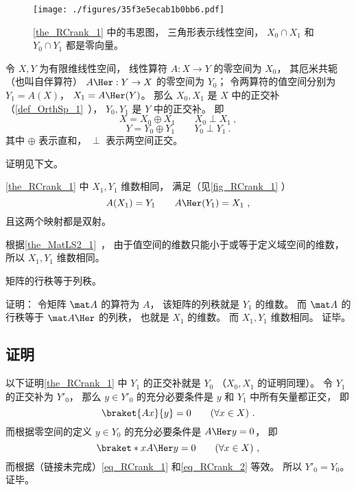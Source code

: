 

\begin{figure}[ht]
\centering
\texttt{[image: ./figures/35f3e5ecab1b0bb6.pdf]}
\caption{\autoref{the_RCrank_1} 中的韦恩图， 三角形表示线性空间， $X_0\cap X_1$ 和 $Y_0\cap  Y_1$ 都是零向量。} \label{fig_RCrank_1}
\end{figure}

\addTODO{!}
\begin{theorem}{}\label{the_RCrank_1}
令 $X, Y$ 为有限维线性空间， 线性算符 $A:X \to Y$ 的零空间为 $X_0$， 其厄米共轭（也叫自伴算符） $A\Her: Y \to X$ 的零空间为 $Y_0$； 令两算符的值空间分别为 $Y_1 = A(X)$， $X_1 = A\Her(Y)$。 那么 $X_0, X_1$ 是 $X$ 中的正交补（\autoref{def_OrthSp_1}~）， $Y_0, Y_1$ 是 $Y$ 中的正交补。 即
\begin{equation}
X = X_0 \oplus X_1 \qquad X_0 \perp X_1~,
\end{equation}
\begin{equation}
Y = Y_0 \oplus Y_1 \qquad Y_0 \perp Y_1~.
\end{equation}
其中 $\oplus$ 表示直和， $\perp$ 表示两空间正交。
\end{theorem}
证明见下文。

\begin{corollary}{}
\autoref{the_RCrank_1} 中 $X_1, Y_1$ 维数相同， 满足（见\autoref{fig_RCrank_1} ）
\begin{equation}\label{eq_RCrank_3}
A(X_1) = Y_1 \qquad A\Her (Y_1) = X_1~,
\end{equation}
且这两个映射都是双射。
\end{corollary}
根据\autoref{the_MatLS2_1}~， 
由于值空间的维数只能小于或等于定义域空间的维数， 所以 $X_1, Y_1$ 维数相同。

\begin{corollary}{}\label{cor_RCrank_1}
矩阵的行秩等于列秩。
\end{corollary}
证明： 令矩阵 $\mat A$ 的算符为 $A$， 该矩阵的列秩就是 $Y_1$ 的维数。 而 $\mat A$ 的行秩等于 $\mat A\Her$ 的列秩， 也就是 $X_1$ 的维数。 而 $X_1, Y_1$ 维数相同。 证毕。

\subsection{证明}
以下证明\autoref{the_RCrank_1} 中 $Y_1$ 的正交补就是 $Y_0$ （$X_0, X_1$ 的证明同理）。 令 $Y_1$ 的正交补为 $Y'_0$， 那么 $y \in Y'_0$ 的充分必要条件是 $y$ 和 $Y_1$ 中所有矢量都正交， 即
\begin{equation}\label{eq_RCrank_1}
\braket{Ax}{y} = 0 \qquad (\forall x \in X)~.
\end{equation}
而根据零空间的定义 $y \in Y_0$ 的充分必要条件是 $A\Her y = 0$， 即
\begin{equation}\label{eq_RCrank_2}
\braket*{x}{A\Her y} = 0 \qquad (\forall x \in X)~,
\end{equation}
而根据（链接未完成）\autoref{eq_RCrank_1} 和\autoref{eq_RCrank_2} 等效。 所以 $Y'_0 = Y_0$。 证毕。
